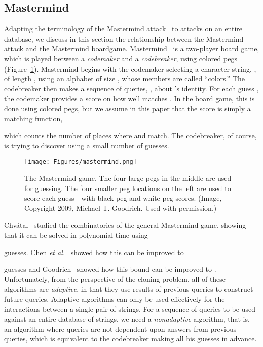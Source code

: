 \documentclass{article}
\begin{document}
\subsection{Mastermind}
Adapting the terminology of the Mastermind attack~\cite{g-magd-09} 
to attacks on an entire database, we discuss in this section the
relationship between the Mastermind attack and the Mastermind
boardgame.  Mastermind~\cite{c-m-83,k-cmm-77} 
is a two-player board game, 
which is played between a \emph{codemaker} and a
\emph{codebreaker}, using colored pegs
(Figure~\ref{fig-mastermind}).
Mastermind begins with
the codemaker selecting a character string, , of length , using an
alphabet of size , whose members are called ``colors.''
The codebreaker then makes a sequence of queries, 
, about 's identity.
For each guess , the codemaker provides a score on how well
 matches .
In the board game, this is done using colored pegs, but we assume in this
paper that the score is simply a matching function,

which counts the number of places where  and  match.
The codebreaker, of course, is trying to discover  using 
a small number of guesses.

\begin{figure}
\begin{center}
\texttt{[image: Figures/mastermind.png]}
\caption{The Mastermind game. The four large pegs in the middle are
used for guessing. The four smaller peg locations on the left are
used to score each guess---with black-peg and white-peg scores. 
(Image, Copyright 2009, Michael T. Goodrich. Used with permission.)
}
\label{fig-mastermind}
\end{center}
\end{figure}


Chv{\'a}tal~\cite{c-m-83} studied the combinatorics of 
the general Mastermind game, showing that it
can be solved in polynomial time using 

guesses. 
Chen {\it et al.}~\cite{cch-fhcaq-96} showed how this can be
improved to

guesses and
Goodrich~\cite{g-oacmg-09} showed how this bound can be improved to
.
Unfortunately, from the perspective of the cloning problem,
all of these algorithms are \emph{adaptive}, in that they use
results of previous queries to construct future queries.
Adaptive algorithms can only be used effectively for the interactions between
a single pair of strings. For a sequence of queries to be used against an
entire database of strings, we need a \emph{nonadaptive} algorithm, 
that is, an algorithm where queries are not dependent upon answers
from previous queries, which is
equivalent to the codebreaker making all his guesses in advance.
\end{document}
